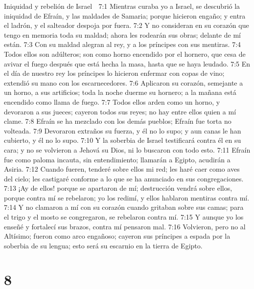 Iniquidad y rebelión de Israel  

7:1 Mientras curaba yo a Israel, se descubrió la iniquidad de Efraín, y las maldades de Samaria; porque hicieron engaño; y entra el ladrón, y el salteador despoja por fuera.  
7:2 Y no consideran en su corazón que tengo en memoria toda su maldad; ahora les rodearán sus obras; delante de mí están.  
7:3 Con su maldad alegran al rey, y a los príncipes con sus mentiras.  
7:4 Todos ellos son adúlteros; son como horno encendido por el hornero, que cesa de avivar el fuego después que está hecha la masa, hasta que se haya leudado.  
7:5 En el día de nuestro rey los príncipes lo hicieron enfermar con copas de vino; extendió su mano con los escarnecedores.  
7:6 Aplicaron su corazón, semejante a un horno, a sus artificios; toda la noche duerme su hornero; a la mañana está encendido como llama de fuego.  
7:7 Todos ellos arden como un horno, y devoraron a sus jueces; cayeron todos sus reyes; no hay entre ellos quien a mí clame.  
7:8 Efraín se ha mezclado con los demás pueblos; Efraín fue torta no volteada.  
7:9 Devoraron extraños su fuerza, y él no lo supo; y aun canas le han cubierto, y él no lo supo.  
7:10 Y la soberbia de Israel testificará contra él en su cara; y no se volvieron a Jehová su Dios, ni lo buscaron con todo esto.  
7:11 Efraín fue como paloma incauta, sin entendimiento; llamarán a Egipto, acudirán a Asiria.  
7:12 Cuando fueren, tenderé sobre ellos mi red; les haré caer como aves del cielo; les castigaré conforme a lo que se ha anunciado en sus congregaciones.  
7:13 ¡Ay de ellos! porque se apartaron de mí; destrucción vendrá sobre ellos, porque contra mí se rebelaron; yo los redimí, y ellos hablaron mentiras contra mí.  
7:14 Y no clamaron a mí con su corazón cuando gritaban sobre sus camas; para el trigo y el mosto se congregaron, se rebelaron contra mí.  
7:15 Y aunque yo los enseñé y fortalecí sus brazos, contra mí pensaron mal.  
7:16 Volvieron, pero no al Altísimo; fueron como arco engañoso; cayeron sus príncipes a espada por la soberbia de su lengua; esto será su escarnio en la tierra de Egipto.  

\chapter{8}

